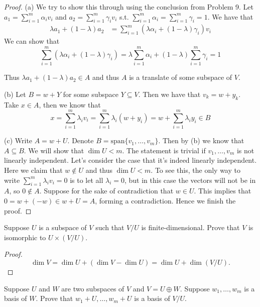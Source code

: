 \documentclass{extarticle}
\begin{document}
\begin{proof}
(a) We try to show this through using the conclusion from Problem 9. Let \(a_1 = \sum_{i=1}^{m}\alpha_i v_i\)
and \(a_2 = \sum_{i=1}^{m} \gamma_i v_i\) s.t. \(\sum_{i=1}^{m} \alpha_i = \sum_{i=1}^m \gamma_i = 1\). We have that 
\begin{align*}
    \lambda a_1 + (1 - \lambda) a_2 
    &= \sum_{i=1}^{m} (\lambda \alpha_i + (1 - \lambda) \gamma_i ) v_i 
\end{align*}
We can show that 
\[\sum_{i=1}^{m} (\lambda \alpha_i + (1 - \lambda) \gamma_i ) 
= \lambda \sum_{i=1}^{m} \alpha_i + (1 - \lambda) \sum_{i=1}^{m}\gamma_i = 1\]

Thus \(\lambda a_1 + (1 - \lambda) a_2 \in A\) and thus \(A\) is a translate of some subspace of \(V\). 

(b) Let \(B = w + Y\) for some subspace \(Y \subseteq V\). Then we have 
that \(v_k = w + y_k\). Take \(x \in A\), then we know that 
\[x = \sum_{i=1}^{m} \lambda_i v_i = \sum_{i=1}^{m} 
\lambda_i (w + y_i) = w + \sum_{i=1}^{m} \lambda_i y_i \in B\]

(c) Write \(A = w + U\). Denote \(B = \text{span} \{v_1, \ldots, v_m\}\). 
Then by (b) we know that \(A \subseteq B\). We will show that \(\dim U 
< m\). The statement is trivial if \(v_1, \ldots, v_m\) is not linearly 
independent. Let's consider the case that it's indeed linearly independent. 
Here we claim that \(w \notin U\) and thus \(\dim U < m\). To see this, 
the only way to write \(\sum_{i=1}^{m} \lambda_i v_i = 0\) is to let all 
\(\lambda_i = 0\), but in this case the vectors will not be in \(A\), so 
\(0 \notin A\). Suppose for the sake 
of contradiction that \(w \in U\). 
This implies that \(0 = w + (-w) \in w + U = A\), forming a contradiction. 
Hence we finish the proof. 

\end{proof}


\begin{problem}{13}
    Suppose \(U\) is a subspace of \(V\) such that \(V / U\) is finite-dimensional. 
    Prove that \(V\) is isomorphic to \(U \times (V / U)\). 
\end{problem}

\begin{proof}
\[\dim V = \dim U + (\dim V - \dim U) = \dim U + \dim (V / U).\]
\end{proof}

\begin{problem}{14}
    Suppose \(U\) and \(W\) are two subspaces of \(V\) and \(V = U 
    \oplus W\). Suppose \(w_1, \ldots, w_m\) is a basis of \(W\). 
    Prove that \(w_1 + U, \ldots, w_m + U\) is a basis of 
    \(V / U\).  
\end{problem}
\end{document}
